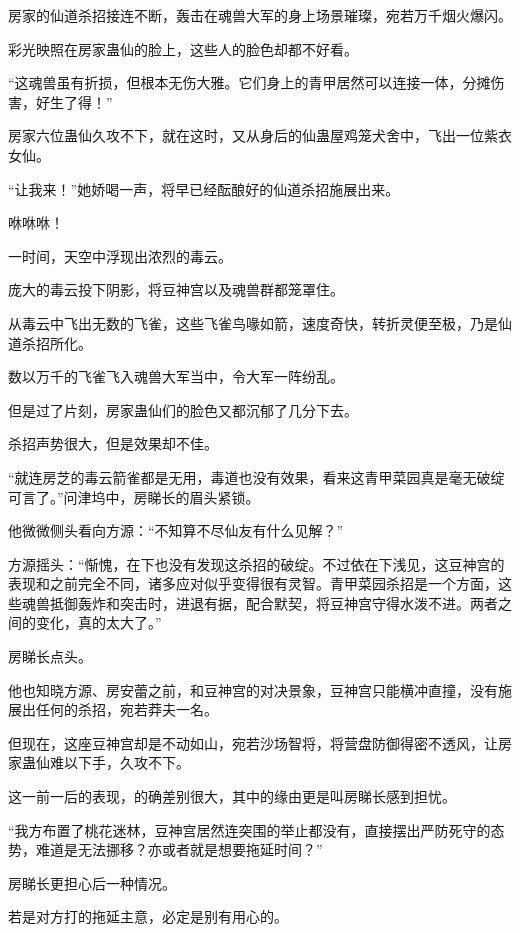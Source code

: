
\begin{this_body}

房家的仙道杀招接连不断，轰击在魂兽大军的身上场景璀璨，宛若万千烟火爆闪。

彩光映照在房家蛊仙的脸上，这些人的脸色却都不好看。

“这魂兽虽有折损，但根本无伤大雅。它们身上的青甲居然可以连接一体，分摊伤害，好生了得！”

房家六位蛊仙久攻不下，就在这时，又从身后的仙蛊屋鸡笼犬舍中，飞出一位紫衣女仙。

“让我来！”她娇喝一声，将早已经酝酿好的仙道杀招施展出来。

咻咻咻！

一时间，天空中浮现出浓烈的毒云。

庞大的毒云投下阴影，将豆神宫以及魂兽群都笼罩住。

从毒云中飞出无数的飞雀，这些飞雀鸟喙如箭，速度奇快，转折灵便至极，乃是仙道杀招所化。

数以万千的飞雀飞入魂兽大军当中，令大军一阵纷乱。

但是过了片刻，房家蛊仙们的脸色又都沉郁了几分下去。

杀招声势很大，但是效果却不佳。

“就连房芝的毒云箭雀都是无用，毒道也没有效果，看来这青甲菜园真是毫无破绽可言了。”问津坞中，房睇长的眉头紧锁。

他微微侧头看向方源：“不知算不尽仙友有什么见解？”

方源摇头：“惭愧，在下也没有发现这杀招的破绽。不过依在下浅见，这豆神宫的表现和之前完全不同，诸多应对似乎变得很有灵智。青甲菜园杀招是一个方面，这些魂兽抵御轰炸和突击时，进退有据，配合默契，将豆神宫守得水泼不进。两者之间的变化，真的太大了。”

房睇长点头。

他也知晓方源、房安蕾之前，和豆神宫的对决景象，豆神宫只能横冲直撞，没有施展出任何的杀招，宛若莽夫一名。

但现在，这座豆神宫却是不动如山，宛若沙场智将，将营盘防御得密不透风，让房家蛊仙难以下手，久攻不下。

这一前一后的表现，的确差别很大，其中的缘由更是叫房睇长感到担忧。

“我方布置了桃花迷林，豆神宫居然连突围的举止都没有，直接摆出严防死守的态势，难道是无法挪移？亦或者就是想要拖延时间？”

房睇长更担心后一种情况。

若是对方打的拖延主意，必定是别有用心的。


\end{this_body}
